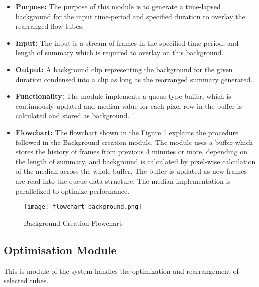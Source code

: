     \begin{itemize}
        \item \textbf{Purpose:} The purpose of this module is to generate a
        time-lapsed background for the input time-period and specified duration
        to overlay the rearranged flow-tubes.
        \item \textbf{Input:} The input is a stream of frames in the specified
        time-period, and length of summary which is required to overlay on this
        background.
        \item \textbf{Output:} A background clip representing the background
        for the given duration condensed into a clip as long as the rearranged
        summary generated.
        \item \textbf{Functionality:} The module implements a queue type
        buffer, which is continuously updated and median value for each pixel
        row in the buffer is calculated and stored as background.
        \item \textbf{Flowchart:} The flowchart shown in the Figure
        \ref{img:flowchart-background} explains the procedure followed in the
        Background creation module. The module uses a buffer which stores the
        history of frames from previous 4 minutes or more, depending on the
        length of summary, and background is calculated by pixel-wise
        calculation of the median across the whole buffer. The buffer is updated
        as new frames are read into the queue data structure. The median
        implementation is parallelized to optimize performance.
    \end{itemize}

    \begin{figure}[H]
        \centering
        \texttt{[image: flowchart-background.png]}
        \caption{Background Creation Flowchart}
        \label{img:flowchart-background}
    \end{figure}


    \subsection{Optimisation Module}
    This is module of the system handles the optimization and rearrangement of
    selected tubes.

